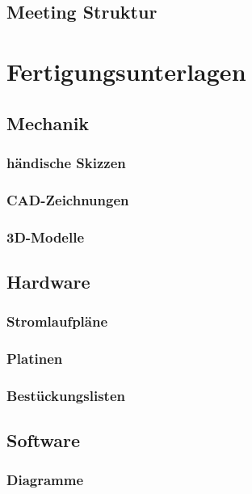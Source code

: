 \documentclass[titlepage,12pt,twoside]{article}
\begin{document}
\subsection{Meeting Struktur}

\section{Fertigungsunterlagen}
\subsection{Mechanik}
\subsubsection{händische Skizzen}
\subsubsection{CAD-Zeichnungen}
\subsubsection{3D-Modelle}

\subsection{Hardware}
\subsubsection{Stromlaufpläne}
\subsubsection{Platinen}
\subsubsection{Bestückungslisten}

\subsection{Software}
\subsubsection{Diagramme}
\end{document}
